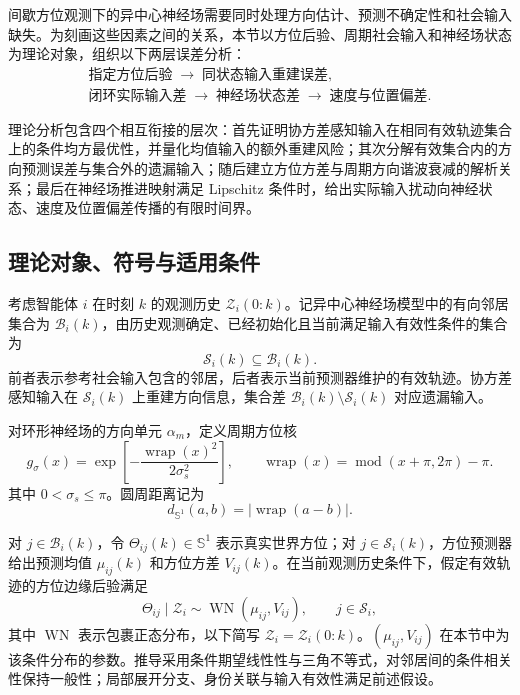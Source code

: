 \documentclass[UTF8,fontset=windows,11pt]{ctexart}
\newcommand{\Sone}{\mathbb S^1}
\begin{document}
间歇方位观测下的异中心神经场需要同时处理方向估计、预测不确定性和社会输入缺失。为刻画这些因素之间的关系，本节以方位后验、周期社会输入和神经场状态为理论对象，组织以下两层误差分析：
\[
\begin{gathered}
\text{指定方位后验}\;\longrightarrow\;\text{同状态输入重建误差},\\
\text{闭环实际输入差}\;\longrightarrow\;\text{神经场状态差}\;\longrightarrow\;\text{速度与位置偏差}.
\end{gathered}
\]

理论分析包含四个相互衔接的层次：首先证明协方差感知输入在相同有效轨迹集合上的条件均方最优性，并量化均值输入的额外重建风险；其次分解有效集合内的方向预测误差与集合外的遗漏输入；随后建立方位方差与周期方向谐波衰减的解析关系；最后在神经场推进映射满足 Lipschitz 条件时，给出实际输入扰动向神经状态、速度及位置偏差传播的有限时间界。

\subsection{理论对象、符号与适用条件}

考虑智能体 $i$ 在时刻 $k$ 的观测历史 $\mathcal Z_i(0:k)$。记异中心神经场模型中的有向邻居集合为 $\mathcal B_i(k)$，由历史观测确定、已经初始化且当前满足输入有效性条件的集合为
\[
\mathcal S_i(k)\subseteq\mathcal B_i(k).
\]
前者表示参考社会输入包含的邻居，后者表示当前预测器维护的有效轨迹。协方差感知输入在 $\mathcal S_i(k)$ 上重建方向信息，集合差 $\mathcal B_i(k)\setminus\mathcal S_i(k)$ 对应遗漏输入。

对环形神经场的方向单元 $\alpha_m$，定义周期方位核
\begin{equation}
 g_\sigma(x)=\exp\!\left[-\frac{\operatorname{wrap}(x)^2}{2\sigma_s^2}\right],
 \qquad
 \operatorname{wrap}(x)=\operatorname{mod}(x+\pi,2\pi)-\pi .
 \label{eq:v2_kernel}
\end{equation}
其中 $0<\sigma_s\leq\pi$。圆周距离记为
\begin{equation}
 d_{\Sone}(a,b)=|\operatorname{wrap}(a-b)|.
 \label{eq:v2_circle_distance}
\end{equation}

对 $j\in\mathcal B_i(k)$，令 $\Theta_{ij}(k)\in\Sone$ 表示真实世界方位；对 $j\in\mathcal S_i(k)$，方位预测器给出预测均值 $\mu_{ij}(k)$ 和方位方差 $V_{ij}(k)$。在当前观测历史条件下，假定有效轨迹的方位边缘后验满足
\begin{equation}
 \Theta_{ij}\mid\mathcal Z_i\sim\operatorname{WN}(\mu_{ij},V_{ij}),
 \qquad j\in\mathcal S_i,
 \label{eq:v2_wn_assumption}
\end{equation}
其中 $\operatorname{WN}$ 表示包裹正态分布，以下简写 $\mathcal Z_i=\mathcal Z_i(0:k)$。$(\mu_{ij},V_{ij})$ 在本节中为该条件分布的参数。推导采用条件期望线性性与三角不等式，对邻居间的条件相关性保持一般性；局部展开分支、身份关联与输入有效性满足前述假设。
\end{document}
